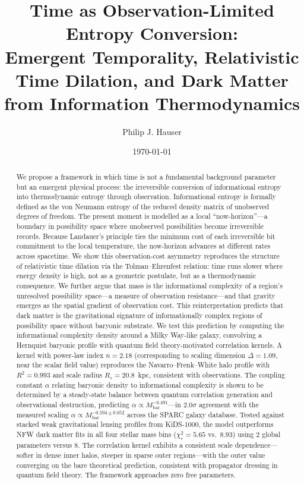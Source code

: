 \documentclass[12pt,a4paper]{article}
\title{Time as Observation-Limited Entropy Conversion: \\
Emergent Temporality, Relativistic Time Dilation, and Dark Matter \\
from Information Thermodynamics}
\author{Philip J. Hauser}
\date{\today}
\begin{document}
\maketitle

\begin{abstract}
We propose a framework in which time is not a fundamental background parameter but an emergent physical process: the irreversible conversion of informational entropy into thermodynamic entropy through observation. Informational entropy is formally defined as the von Neumann entropy of the reduced density matrix of unobserved degrees of freedom. The present moment is modelled as a local ``now-horizon''---a boundary in possibility space where unobserved possibilities become irreversible records. Because Landauer's principle ties the minimum cost of each irreversible bit commitment to the local temperature, the now-horizon advances at different rates across spacetime. We show this observation-cost asymmetry reproduces the structure of relativistic time dilation via the Tolman--Ehrenfest relation: time runs slower where energy density is high, not as a geometric postulate, but as a thermodynamic consequence. We further argue that mass is the informational complexity of a region's unresolved possibility space---a measure of observation resistance---and that gravity emerges as the spatial gradient of observation cost. This reinterpretation predicts that dark matter is the gravitational signature of informationally complex regions of possibility space without baryonic substrate. We test this prediction by computing the informational complexity density around a Milky Way-like galaxy, convolving a Hernquist baryonic profile with quantum field theory-motivated correlation kernels. A kernel with power-law index $n = 2.18$ (corresponding to scaling dimension $\Delta = 1.09$, near the scalar field value) reproduces the Navarro--Frenk--White halo profile with $R^2 = 0.993$ and scale radius $R_s = 20.8$~kpc, consistent with observations. The coupling constant $\alpha$ relating baryonic density to informational complexity is shown to be determined by a steady-state balance between quantum correlation generation and observational destruction, predicting $\alpha \propto M_{\mathrm{bar}}^{-0.491}$---in $2.0\sigma$ agreement with the measured scaling $\alpha \propto M_{\mathrm{bar}}^{-0.594 \pm 0.052}$ across the SPARC galaxy database. Tested against stacked weak gravitational lensing profiles from KiDS-1000, the model outperforms NFW dark matter fits in all four stellar mass bins ($\chi^2_r = 5.65$ vs.\ $8.93$) using 2 global parameters versus 8. The correlation kernel exhibits a consistent scale dependence---softer in dense inner halos, steeper in sparse outer regions---with the outer value converging on the bare theoretical prediction, consistent with propagator dressing in quantum field theory. The framework approaches zero free parameters.
\end{abstract}
\end{document}

